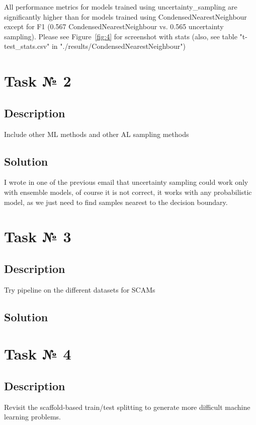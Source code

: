 \documentclass[a4paper,10pt]{article}
\begin{document}
All performance metrics for models trained using uncertainty\_sampling are significantly higher than for models trained using CondensedNearestNeighbour except for F1 (0.567 CondensedNearestNeighbour vs. 0.565 uncertainty sampling). Please see Figure~\ref{fig:4} for screenshot with stats (also, see table "t-test\_stats.csv" in "./results/CondensedNearestNeighbour")


\section{Task № 2}
\subsection{Description}
Include other ML methods and other AL sampling methods
\subsection{Solution}
I wrote in one of the previous email that uncertainty sampling could work only with ensemble models, of course it is not correct, it works with any probabilistic model, as we just need to find samples nearest to the decision boundary.

\section{Task № 3}
\subsection{Description}
Try pipeline on the different datasets for SCAMs
\subsection{Solution}

\section{Task № 4}


\subsection{Description}
Revisit the scaffold-based train/test splitting to generate more difficult machine learning problems.
\end{document}
